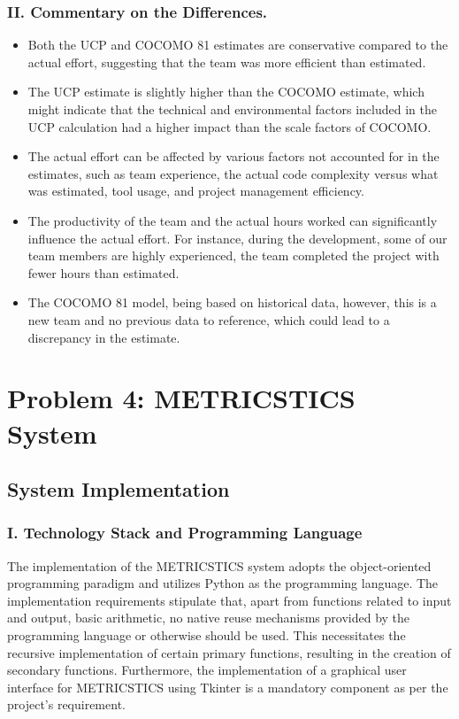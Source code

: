 \documentclass[english,12pt,a4paper]{report}
\begin{document}
	\subsection*{II. Commentary on the Differences.}
	\begin{itemize}[leftmargin=*]
		\item Both the UCP and COCOMO 81 estimates are conservative compared to the actual effort, suggesting that the team was more efficient than estimated.
		
		\item The UCP estimate is slightly higher than the COCOMO estimate, which might indicate that the technical and environmental factors included in the UCP calculation had a higher impact than the scale factors of COCOMO.
		
		\item The actual effort can be affected by various factors not accounted for in the estimates, such as team experience, the actual code complexity versus what was estimated, tool usage, and project management efficiency.
		
		\item The productivity of the team and the actual hours worked can significantly influence the actual effort. For instance, during the development, some of our team members are highly experienced, the team completed the project with fewer hours than estimated.
		
		\item The COCOMO 81 model, being based on historical data, however, this is a new team and no previous data to reference, which could lead to a discrepancy in the estimate.
	\end{itemize}
	
	
	\chapter{Problem 4: METRICSTICS System}
	\section{System Implementation}
	\subsection*{I. Technology Stack and Programming Language}
	
	The implementation of the METRICSTICS system adopts the object-oriented programming paradigm and utilizes Python as the programming language. The implementation requirements stipulate that, apart from functions related to input and output, basic arithmetic, no native reuse mechanisms provided by the programming language or otherwise should be used. This necessitates the recursive implementation of certain primary functions, resulting in the creation of secondary functions. Furthermore, the implementation of a graphical user interface for METRICSTICS using Tkinter is a mandatory component as per the project's requirement.
	
\end{document}
